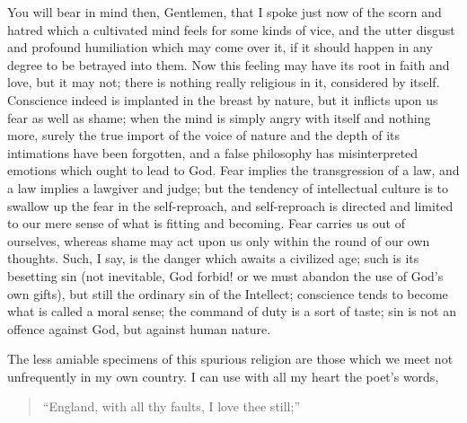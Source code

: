 You will bear in mind then, Gentlemen, that I spoke just now of the
scorn and hatred which a cultivated mind feels for some kinds of vice,
and the utter disgust and profound humiliation which may come over it,
if it should happen in any degree to be betrayed into them. Now this
feeling may have its root in faith and love, but it may not; there is
nothing really religious in it, considered by itself. Conscience
indeed is implanted in the breast by nature, but it inflicts upon us
fear as well as shame; when the mind is simply angry with itself and
nothing more, surely the true import of the voice of nature and the
depth of its intimations have been forgotten, and a false philosophy
has misinterpreted emotions which ought to lead to God. Fear implies
the transgression of a law, and a law implies a lawgiver and judge;
but the tendency of intellectual culture is to swallow up the fear in
the self-reproach, and self-reproach is directed and limited to our
mere sense of what is fitting and becoming. Fear carries us out of
ourselves, whereas shame may act upon us only within the round of our
own thoughts. Such, I say, is the danger which awaits a civilized age;
such is its besetting sin (not inevitable, God forbid! or we must
abandon the use of God's own gifts), but still the ordinary sin of the
Intellect; conscience tends to become what is called a moral sense;
the command of duty is a sort of taste; sin is not an offence against
God, but against human nature.

The less amiable specimens of this spurious religion are those
which we meet not unfrequently in my own country. I can use with all
my heart the poet's words,

\begin{quote}

``England, with all thy faults, I love thee still;''

\end{quote}

